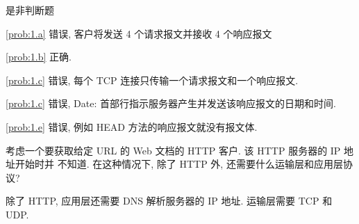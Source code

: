 \documentclass[boxes]{homework}
\begin{document}
\begin{problem}
是非判断题
\end{problem}
\begin{solution}
    \ref{prob:1.a} 错误, 客户将发送 4 个请求报文并接收 4 个响应报文

    \ref{prob:1.b} 正确.

    \ref{prob:1.c} 错误, 每个 TCP 连接只传输一个请求报文和一个响应报文.

    \ref{prob:1.c} 错误, Date: 首部行指示服务器产生并发送该响应报文的日期和时间.

    \ref{prob:1.e} 错误, 例如 HEAD 方法的响应报文就没有报文体.
\end{solution}

\begin{problem}
考虑一个要获取给定 URL 的 Web 文档的 HTTP 客户. 该 HTTP 服务器的 IP 地址开始时并
不知道. 在这种情况下, 除了 HTTP 外, 还需要什么运输层和应用层协议?
\end{problem}
\begin{solution}
    除了 HTTP, 应用层还需要 DNS 解析服务器的 IP 地址. 运输层需要 TCP 和 UDP\@.
\end{solution}
\end{document}

